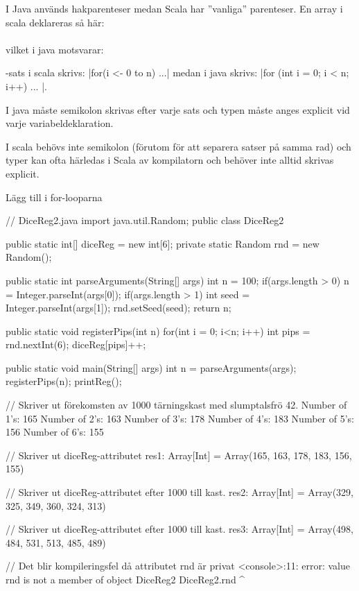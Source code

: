 \SubtaskSolved  I Java används hakparenteser medan Scala har ''vanliga'' parenteser. En array i scala deklareras så här: \\
  \\
 vilket i java motsvarar: 

-sats i scala skrivs: \code|for(i <- 0 to n) {...}| medan i java skrivs: \code|for (int i = 0; i < n; i++) { ... }|.

I java måste semikolon skrivas efter varje sats och typen måste anges explicit vid varje variabeldeklaration.

I scala behövs inte semikolon (förutom för att separera satser på samma rad) och typer kan ofta härledas i Scala av kompilatorn och behöver inte alltid skrivas explicit.

\SubtaskSolved  Lägg till  i for-looparna

\SubtaskSolved  \begin{Code}[language=Java]
// DiceReg2.java
import java.util.Random;
public class DiceReg2{
	public static int[] diceReg = new int[6];
	private static Random rnd = new Random();

	public static int parseArguments(String[] args){
		int n = 100;
		if(args.length > 0) {
			n = Integer.parseInt(args[0]);
		}
		if(args.length > 1) {
			int seed = Integer.parseInt(args[1]);
			rnd.setSeed(seed);
		}
		return n;
	}

	public static void registerPips(int n) {
		for(int i = 0; i<n; i++) {
			int pips = rnd.nextInt(6);
			diceReg[pips]++;
		}
	}

	public static void main(String[] args) {
		int n = parseArguments(args);
		registerPips(n);
		printReg();
	}
}
\end{Code}

\SubtaskSolved

\begin{REPL}
  // Skriver ut förekomsten av 1000 tärningskast med slumptalsfrö 42.
Number of 1's: 165
Number of 2's: 163
Number of 3's: 178
Number of 4's: 183
Number of 5's: 156
Number of 6's: 155

  // Skriver ut diceReg-attributet
res1: Array[Int] = Array(165, 163, 178, 183, 156, 155)

  // Skriver ut diceReg-attributet efter 1000 till kast.
res2: Array[Int] = Array(329, 325, 349, 360, 324, 313)

  // Skriver ut diceReg-attributet efter 1000 till kast.
res3: Array[Int] = Array(498, 484, 531, 513, 485, 489)

  // Det blir kompileringsfel då attributet rnd är privat
<console>:11: error: value rnd is not a member of object DiceReg2
	DiceReg2.rnd
				    ^
\end{REPL}

